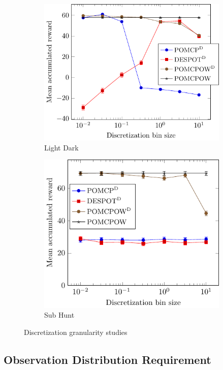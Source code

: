 \begin{figure}[htb]
    \centering
    \begin{subfigure}{\linewidth}
        \centering
        \includegraphics[width=0.8\linewidth]{media/ld_discretization.pdf}
        \caption{Light Dark} \label{fig:lddisc}
    \end{subfigure}

    \begin{subfigure}{\linewidth}
        \centering
        \includegraphics[width=0.72\linewidth]{media/subhunt_discretization.pdf}
        \caption{Sub Hunt}
        \label{fig:shdisc}
    \end{subfigure}

    \caption{Discretization granularity studies} \label{fig:disc}
\end{figure}



\subsection{Observation Distribution Requirement}

